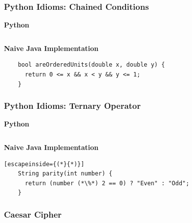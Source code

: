 \documentclass{beamer}
\begin{document}
\begin{frame}[fragile]
  \frametitle{Python Idioms: Chained Conditions}
  \textbf{Python}
  \inputminted{python}{ordered_units.py}
  
  \textbf{Naive Java Implementation}
  \begin{lstlisting}
    bool areOrderedUnits(double x, double y) {
      return 0 <= x && x < y && y <= 1;
    }
  \end{lstlisting}
\end{frame}

\begin{frame}[fragile]
  \frametitle{Python Idioms: Ternary Operator}
  \textbf{Python}
  \inputminted{python}{ternary.py}
  
  \textbf{Naive Java Implementation}
  \begin{lstlisting}[escapeinside={(*}{*)}]
    String parity(int number) {
      return (number (*\%*) 2 == 0) ? "Even" : "Odd";
    }
  \end{lstlisting}
\end{frame}


\begin{frame}
  \frametitle{Caesar Cipher}
  \inputminted{python}{caesar.py}
\end{frame}
\end{document}

